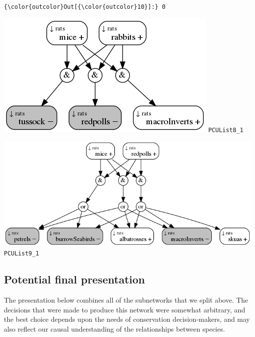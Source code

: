 \documentclass[11pt]{article}
\makeatletter
\def\maxwidth{\ifdim\Gin@nat@width>\linewidth\linewidth
    \else\Gin@nat@width\fi}
\let\Oldincludegraphics\includegraphics
\renewcommand{\includegraphics}[1]{\Oldincludegraphics[width=.8\maxwidth]{#1}}
\makeatother
\begin{document}
\begin{Verbatim}[commandchars=\\\{\}]
{\color{outcolor}Out[{\color{outcolor}10}]:} 0
\end{Verbatim}
            
    \includegraphics{PCUList8_1.png} \texttt{PCUList8\_1}

\includegraphics{PCUList9_1.png} \texttt{PCUList9\_1}

    \subsection{Potential final
presentation}\label{potential-final-presentation}

The presentation below combines all of the subnetworks that we split
above. The decisions that were made to produce this network were
somewhat arbitrary, and the best choice depends upon the needs of
conservation decision-makers, and may also reflect our causal
understanding of the relationships between species.
\end{document}
